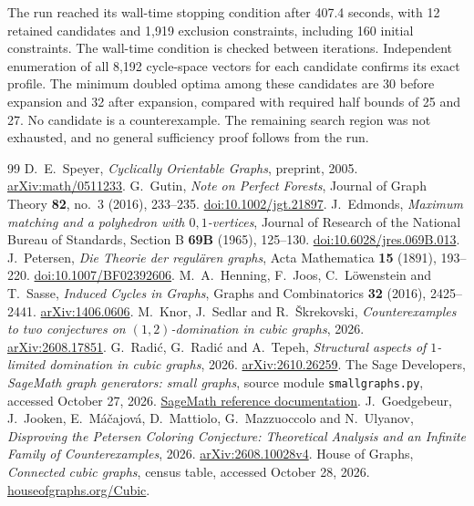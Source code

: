 \documentclass[11pt]{article}
\begin{document}
The run reached its wall-time stopping condition after 407.4 seconds,
with 12 retained candidates and 1,919 exclusion constraints, including
160 initial constraints. The wall-time condition is checked between
iterations. Independent enumeration of all 8,192 cycle-space vectors
for each candidate confirms its exact profile. The minimum doubled
optima among these candidates are 30 before expansion and 32 after
expansion, compared with required half bounds of 25 and 27.
No candidate is a counterexample. The remaining search region was
not exhausted, and no general sufficiency proof follows from the run.

\clearpage
\begin{thebibliography}{99}
D.~E.~Speyer, \emph{Cyclically Orientable Graphs},
preprint, 2005.
\href{https://arxiv.org/abs/math/0511233}{arXiv:math/0511233}.
G.~Gutin, \emph{Note on Perfect Forests}, Journal of Graph Theory
\textbf{82}, no.~3 (2016), 233--235.
\href{https://doi.org/10.1002/jgt.21897}{doi:10.1002/jgt.21897}.
J.~Edmonds, \emph{Maximum matching and a polyhedron with
$0,1$-vertices}, Journal of Research of the National Bureau of
Standards, Section B \textbf{69B} (1965), 125--130.
\href{https://doi.org/10.6028/jres.069B.013}{doi:10.6028/jres.069B.013}.
J.~Petersen, \emph{Die Theorie der regul\"aren graphs},
Acta Mathematica \textbf{15} (1891), 193--220.
\href{https://doi.org/10.1007/BF02392606}{doi:10.1007/BF02392606}.
M.~A.~Henning, F.~Joos, C.~L\"owenstein and T.~Sasse,
\emph{Induced Cycles in Graphs},
Graphs and Combinatorics \textbf{32} (2016), 2425--2441.
\href{https://arxiv.org/abs/1406.0606}{arXiv:1406.0606}.
M.~Knor, J.~Sedlar and R.~\v{S}krekovski,
\emph{Counterexamples to two conjectures on $(1,2)$-domination
in cubic graphs}, 2026.
\href{https://arxiv.org/abs/2608.17851}{arXiv:2608.17851}.
G.~Radi\'c, G.~Radi\'c and A.~Tepeh,
\emph{Structural aspects of $1$-limited domination in cubic graphs},
2026.
\href{https://arxiv.org/abs/2610.26259}{arXiv:2610.26259}.
The Sage Developers, \emph{SageMath graph generators: small graphs},
source module \texttt{smallgraphs.py},
accessed October 27, 2026.
\href{https://doc.sagemath.org/html/en/reference/graphs/sage/graphs/generators/smallgraphs.html}{SageMath reference documentation}.
J.~Goedgebeur, J.~Jooken, E.~M\'a\v{c}ajov\'a, D.~Mattiolo,
G.~Mazzuoccolo and N.~Ulyanov,
\emph{Disproving the Petersen Coloring Conjecture: Theoretical Analysis
and an Infinite Family of Counterexamples}, 2026.
\href{https://arxiv.org/abs/2608.10028v4}{arXiv:2608.10028v4}.
House of Graphs, \emph{Connected cubic graphs}, census table,
accessed October 28, 2026.
\href{https://houseofgraphs.org/Cubic}{houseofgraphs.org/Cubic}.
\end{thebibliography}
\end{document}
